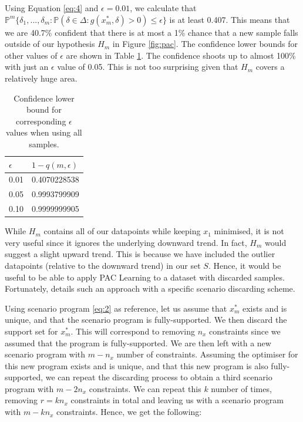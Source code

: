 \documentclass[11pt]{article}
\begin{document}
Using Equation \ref{eq:4} and $\epsilon=0.01$, we calculate that $\mathbb{P}^{m} \{\delta_{1},...,\delta_{m}: \mathbb{P}(\delta \in \Delta: g(x^{*}_{m},\delta) > 0) \leq \epsilon \}$ is at least 0.407. This means that we are 40.7\% confident that there is at most a 1\% chance that a new sample falls outside of our hypothesis $H_{m}$ in Figure \ref{fig:pac}. The confidence lower bounds for other values of $\epsilon$ are shown in Table \ref{tab:confidence}. The confidence shoots up to almost 100\% with just an $\epsilon$ value of 0.05. This is not too surprising given that $H_{m}$ covers a relatively huge area.

\begin{table}[]
\centering
\begin{tabular}{l|l}
\textbf{$\epsilon$} & \textbf{$1-q(m,\epsilon)$} \\ \hline
0.01             & 0.4070228538 \\ \hline
0.05             & 0.9993799909 \\ \hline
0.10             & 0.9999999905
\end{tabular}
\caption{Confidence lower bound for corresponding $\epsilon$ values when using all samples.}
\label{tab:confidence}
\end{table}


While $H_{m}$ contains all of our datapoints while keeping $x_{1}$ minimised, it is not very useful since it ignores the underlying downward trend. In fact, $H_{m}$ would suggest a slight upward trend. This is because we have included the outlier datapoints (relative to the downward trend) in our set $S$. Hence, it would be useful to be able to apply PAC Learning to a dataset with discarded samples. Fortunately, \cite{kostas} details such an approach with a specific scenario discarding scheme.

Using scenario program \ref{eq:2} as reference, let us assume that $x^{*}_{m}$ exists and is unique, and that the scenario program is fully-supported. We then discard the support set for $x^{*}_{m}$. This will correspond to removing $n_{x}$ constraints since we assumed that the program is fully-supported. We are then left with a new scenario program with $m-n_{x}$ number of constraints. Assuming the optimiser for this new program exists and is unique, and that this new program is also fully-supported, we can repeat the discarding process to obtain a third scenario program with $m-2n_{x}$ constraints. We can repeat this $k$ number of times, removing $r=kn_{x}$ constraints in total and leaving us with a scenario program with $m-kn_{x}$ constraints. Hence, we get the following:
\end{document}
